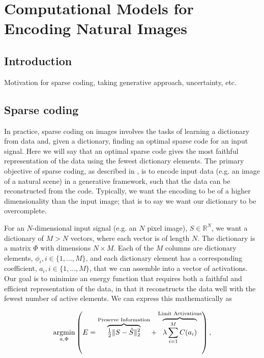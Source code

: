 \chapter{Computational Models for Encoding Natural Images}


\section{Introduction}
Motivation for sparse coding, taking generative approach, uncertainty, etc.

\section{Sparse coding}
In practice, sparse coding on images involves the tasks of learning a dictionary from data and, given a dictionary, finding an optimal sparse code for an input signal. Here we will say that an optimal sparse code gives the most faithful representation of the data using the fewest dictionary elements. The primary objective of sparse coding, as described in \cite{olshausen1997sparse}, is to encode input data (e.g. an image of a natural scene) in a generative framework, such that the data can be reconstructed from the code. Typically, we want the encoding to be of a higher dimensionality than the input image; that is to say we want our dictionary to be overcomplete.

For an $N$-dimensional input signal (e.g. an $N$ pixel image), $S \in \mathbb{R}^{N}$, we want a dictionary of $M > N$ vectors, where each vector is of length $N$. The dictionary is a matrix $\Phi$ with dimensions $N \times M$. Each of the $M$ columns are dictionary elements, $\phi_{i}, i \in \{1,...,M\}$, and each dictionary element has a corresponding coefficient, $a_{i}, i \in \{1,...,M\}$, that we can assemble into a vector of activations. Our goal is to minimize an energy function that requires both a faithful and efficient representation of the data, in that it reconstructs the data well with the fewest number of active elements. We can express this mathematically as

\begin{equation}\label{eq:ch2_sparse_energy}
    \argmin\limits_{a, \Phi}
        \left( E =
            \overbrace{ \tfrac{1}{2} \| S - \hat{S} \|_{2}^{2} }^\text{Preserve Information} +
        \overbrace{ \lambda \sum\limits_{i=1}^{M}C(a_{i}) }^\text{Limit Activations} \right),
\label{energyfunc}
\end{equation}

